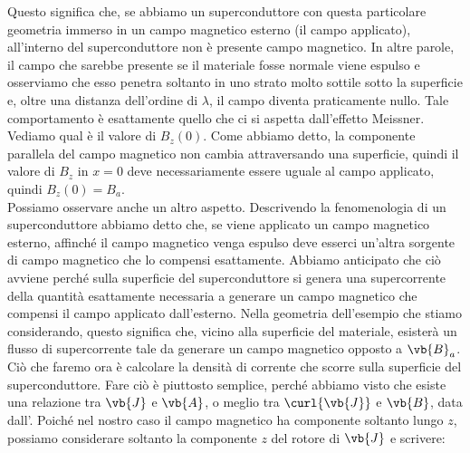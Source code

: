 \hspace{-0.35cm}Questo significa che, se abbiamo un superconduttore con questa particolare geometria immerso in un campo magnetico esterno (il campo applicato), all'interno del superconduttore non è presente campo magnetico. In altre parole, il campo che sarebbe presente se il materiale fosse normale viene espulso e osserviamo che esso penetra soltanto in uno strato molto sottile sotto la superficie e, oltre una distanza dell'ordine di $\lambda$, il campo diventa praticamente nullo. Tale comportamento è esattamente quello che ci si aspetta dall'effetto Meissner.\\
Vediamo qual è il valore di $B_z(0)$. Come abbiamo detto, la componente parallela del campo magnetico non cambia attraversando una superficie, quindi il valore di $B_z$ in $x=0$ deve necessariamente essere uguale al campo applicato, quindi $B_z(0)=B_a$.\\
Possiamo osservare anche un altro aspetto. Descrivendo la fenomenologia di un superconduttore abbiamo detto che, se viene applicato un campo magnetico esterno, affinché il campo magnetico venga espulso deve esserci un'altra sorgente di campo magnetico che lo compensi esattamente. Abbiamo anticipato che ciò avviene perché sulla superficie del superconduttore si genera una supercorrente della quantità esattamente necessaria a generare un campo magnetico che compensi il campo applicato dall'esterno. Nella geometria dell'esempio che stiamo considerando, questo significa che, vicino alla superficie del materiale, esisterà un flusso di supercorrente tale da generare un campo magnetico opposto a $\vb{B}_a$. Ciò che faremo ora è calcolare la densità di corrente che scorre sulla superficie del superconduttore. Fare ciò è piuttosto semplice, perché abbiamo visto che esiste una relazione tra $\vb{J}$ e $\vb{A}$, o meglio tra $\curl{\vb{J}}$ e $\vb{B}$, data dall'. Poiché nel nostro caso il campo magnetico ha componente soltanto lungo $z$, possiamo considerare soltanto la componente $z$ del rotore di $\vb{J}$ e scrivere:
